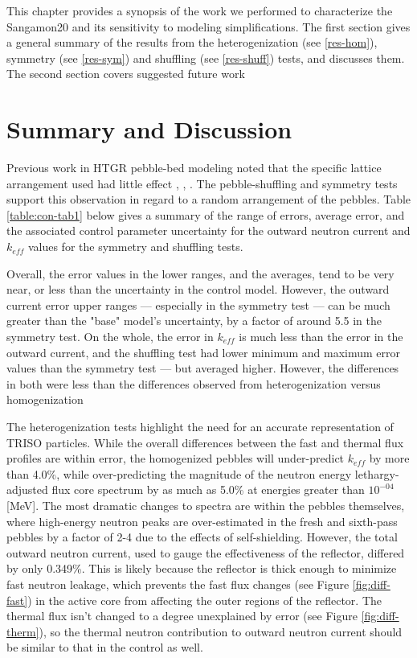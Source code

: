 \label{conc}

This chapter provides a synopsis of the work we performed to characterize the Sangamon20 and its sensitivity to modeling simplifications.  The first section gives a general summary of the results from the heterogenization (see \autoref{res-hom}), symmetry (see \autoref{res-sym}) and shuffling (see \autoref{res-shuff}) tests, and discusses them.  The second section covers suggested future work

\section{Summary and Discussion}

Previous work in HTGR pebble-bed modeling noted that the specific lattice arrangement used had little effect \cite{turkmen_effect_2012}, \cite{karriem_mcnp_2001}, \cite{brown_stochastic_2005}.  The pebble-shuffling and symmetry tests support this observation in regard to a  random arrangement of the pebbles.  Table \ref{table:con-tab1} below gives a summary of the range of errors, average error, and the associated control parameter uncertainty for the outward neutron current and $k_{eff}$ values for the symmetry and shuffling tests.



Overall, the error values in the lower ranges, and the averages, tend to be very near, or less than  the uncertainty in the control model.  However, the outward current error upper ranges --- especially in the symmetry test --- can be much greater than the "base" model's uncertainty, by a factor of around 5.5 in the symmetry test.  On the whole, the error in $k_{eff}$ is much less than the error in the outward current, and the shuffling test had lower minimum and maximum error values than the symmetry test --- but averaged higher.  However, the differences in both were less than the differences observed from heterogenization versus homogenization

The heterogenization tests highlight the need for an accurate representation of TRISO particles.  While the overall differences between the fast and thermal flux profiles are within error, the homogenized pebbles will under-predict $k_{eff}$ by more than 4.0\%, while over-predicting the magnitude of the neutron energy lethargy-adjusted flux core spectrum by as much as 5.0\% at energies greater than $10^{-04}$ [MeV].  The most dramatic changes to spectra are within the pebbles themselves, where high-energy neutron peaks are over-estimated in the fresh and sixth-pass pebbles by a factor of 2-4 due to the effects of self-shielding.  However, the total outward neutron current, used to gauge the effectiveness of the reflector, differed by only 0.349\%.  This is likely because the reflector is thick enough to minimize fast neutron leakage, which prevents the fast flux changes (see Figure \ref{fig:diff-fast}) in the active core from affecting the outer regions of the reflector. The thermal flux isn't changed to a degree unexplained by error (see Figure \ref{fig:diff-therm}), so the thermal neutron contribution to outward neutron current should be similar to that in the control as well.


